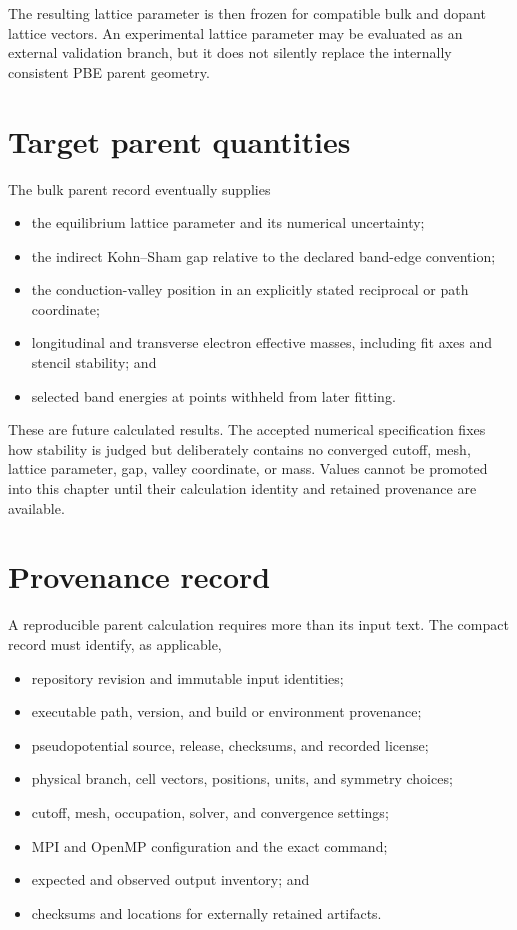The resulting lattice parameter is then frozen for compatible bulk and dopant
lattice vectors. An experimental lattice parameter may be evaluated as an
external validation branch, but it does not silently replace the internally
consistent PBE parent geometry.

\section{Target parent quantities}

The bulk parent record eventually supplies

\begin{itemize}
  \item the equilibrium lattice parameter and its numerical uncertainty;
  \item the indirect Kohn--Sham gap relative to the declared band-edge
    convention;
  \item the conduction-valley position in an explicitly stated reciprocal or
    path coordinate;
  \item longitudinal and transverse electron effective masses, including fit
    axes and stencil stability; and
  \item selected band energies at points withheld from later fitting.
\end{itemize}

These are future calculated results. The accepted numerical specification fixes
how stability is judged but deliberately contains no converged cutoff, mesh,
lattice parameter, gap, valley coordinate, or mass. Values cannot be promoted
into this chapter until their calculation identity and retained provenance are
available.

\section{Provenance record}

A reproducible parent calculation requires more than its input text. The compact
record must identify, as applicable,

\begin{itemize}
  \item repository revision and immutable input identities;
  \item executable path, version, and build or environment provenance;
  \item pseudopotential source, release, checksums, and recorded license;
  \item physical branch, cell vectors, positions, units, and symmetry choices;
  \item cutoff, mesh, occupation, solver, and convergence settings;
  \item MPI and OpenMP configuration and the exact command;
  \item expected and observed output inventory; and
  \item checksums and locations for externally retained artifacts.
\end{itemize}


